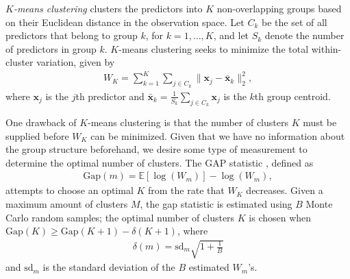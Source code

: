 \documentclass[11pt]{article}
\begin{document}
\textit{$K$-means clustering} \cite{macqueen1967some} clusters the predictors into $K$ non-overlapping groups based on their Euclidean distance in the observation space. 
Let $C_k$ be the set of all predictors that belong to group $k$, for $k = 1, \ldots, K$, and let $S_k$ denote the number of predictors in group $k$. $K$-means clustering seeks to minimize the total within-cluster variation, given by 
\begin{align}
    \label{totwithinclusvar}
    W_K = \sum_{k=1}^K \sum_{j \in C_k} \| \mathbf{x}_j - \bar{\mathbf{x}}_k \|_2^2,
\end{align}
where $\mathbf{x}_j$ is the $j$th predictor and $\bar{\mathbf{x}}_k = \frac{1}{S_k} \sum_{j \in C_k} \mathbf{x}_j$ is the $k$th group centroid. %

One drawback of $K$-means clustering is that the number of clusters $K$ must be supplied before $W_K$ can be minimized. Given that we have no information about the group structure beforehand, we desire some type of measurement to determine the optimal number of clusters. %
The GAP statistic \cite{tibshirani2001estimating}, defined as 
\begin{align}
    \label{GAPstat}
    \mathrm{Gap}(m) = \mathbb{E} \left[ \log(W_m) \right] - \log(W_m),
\end{align}
attempts to choose an optimal $K$ from the rate that $W_K$ decreases. Given a maximum amount of clusters $M$, the gap statistic is estimated using $B$ Monte Carlo random samples; the optimal number of clusters $K$ is chosen  when $\mathrm{Gap}(K) \ge \mathrm{Gap}(K + 1) - \delta(K + 1)$, where 
\begin{align*}
    \delta(m) = \mathrm{sd}_m \sqrt{1 + \frac{1}{B}}
\end{align*}
and $\mathrm{sd}_m$ is the standard deviation of the $B$ estimated $W_m$'s.

\end{document}
